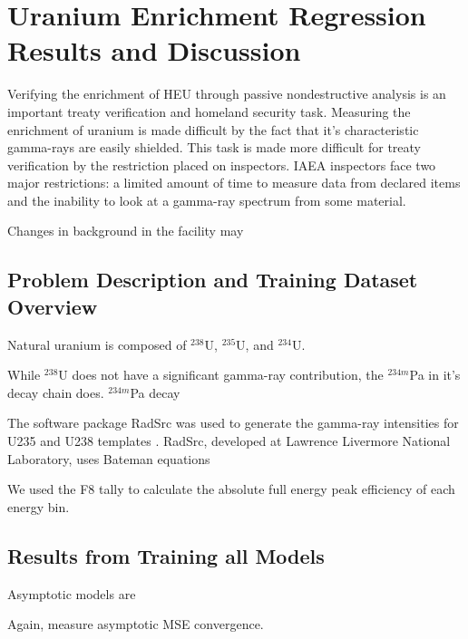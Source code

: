 \chapter{Uranium Enrichment Regression Results and Discussion}


Verifying the enrichment of HEU through passive nondestructive analysis is an important treaty verification and homeland security task. Measuring the enrichment of uranium is made difficult by the fact that it's characteristic gamma-rays are easily shielded. This task is made more difficult for treaty verification by the restriction placed on inspectors. IAEA inspectors face two major restrictions: a limited amount of time to measure data from declared items and the inability to look at a gamma-ray spectrum from some material. 

Changes in background in the facility may 



\section{Problem Description and Training Dataset Overview}

Natural uranium is composed of $^{238}$U, $^{235}$U, and $^{234}$U. 

While $^{238}$U does not have a significant gamma-ray contribution, the $^{234m}$Pa in it's decay chain does. $^{234m}$Pa decay


The software package RadSrc was used to generate the gamma-ray intensities for U235 and U238 templates \cite{Hiller2007}. RadSrc, developed at Lawrence Livermore National Laboratory, uses Bateman equations 

We used the F8 tally to calculate the absolute full energy peak efficiency of each energy bin.



\section{Results from Training all Models}


Asymptotic models are 


Again, measure asymptotic MSE convergence.



